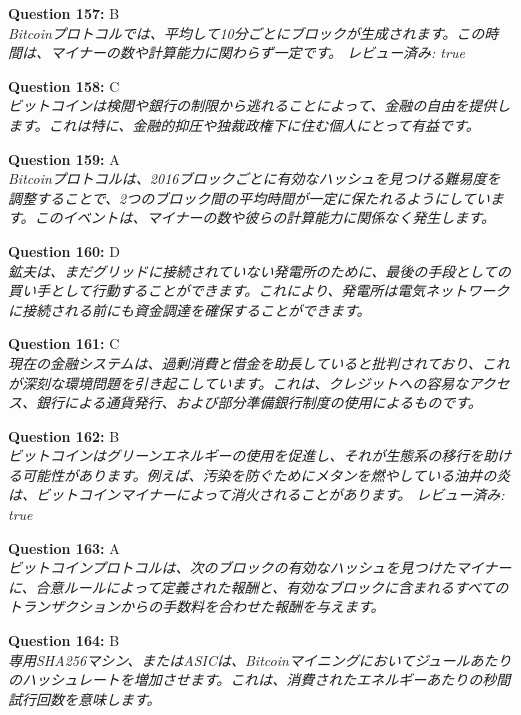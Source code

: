 \documentclass[12pt,a4paper]{article}
\begin{document}
\begin{enumerate}
{{{{{{{{\item \textbf{Question 157:} B
\\ \textit{Bitcoinプロトコルでは、平均して10分ごとにブロックが生成されます。この時間は、マイナーの数や計算能力に関わらず一定です。 レビュー済み: true}

\item \textbf{Question 158:} C
\\ \textit{ビットコインは検閲や銀行の制限から逃れることによって、金融の自由を提供します。これは特に、金融的抑圧や独裁政権下に住む個人にとって有益です。}

\item \textbf{Question 159:} A
\\ \textit{Bitcoinプロトコルは、2016ブロックごとに有効なハッシュを見つける難易度を調整することで、2つのブロック間の平均時間が一定に保たれるようにしています。このイベントは、マイナーの数や彼らの計算能力に関係なく発生します。}

\item \textbf{Question 160:} D
\\ \textit{鉱夫は、まだグリッドに接続されていない発電所のために、最後の手段としての買い手として行動することができます。これにより、発電所は電気ネットワークに接続される前にも資金調達を確保することができます。}

\item \textbf{Question 161:} C
\\ \textit{現在の金融システムは、過剰消費と借金を助長していると批判されており、これが深刻な環境問題を引き起こしています。これは、クレジットへの容易なアクセス、銀行による通貨発行、および部分準備銀行制度の使用によるものです。}

\item \textbf{Question 162:} B
\\ \textit{ビットコインはグリーンエネルギーの使用を促進し、それが生態系の移行を助ける可能性があります。例えば、汚染を防ぐためにメタンを燃やしている油井の炎は、ビットコインマイナーによって消火されることがあります。 レビュー済み: true}

\item \textbf{Question 163:} A
\\ \textit{ビットコインプロトコルは、次のブロックの有効なハッシュを見つけたマイナーに、合意ルールによって定義された報酬と、有効なブロックに含まれるすべてのトランザクションからの手数料を合わせた報酬を与えます。}

\item \textbf{Question 164:} B
\\ \textit{専用SHA256マシン、またはASICは、Bitcoinマイニングにおいてジュールあたりのハッシュレートを増加させます。これは、消費されたエネルギーあたりの秒間試行回数を意味します。}

}}}}}}}}
\end{enumerate}
\end{document}
